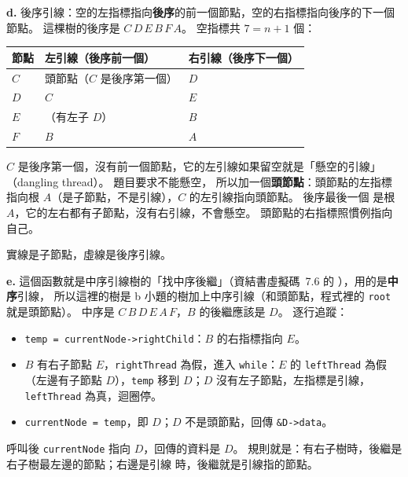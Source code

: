 \begin{pastsoln}
\textbf{d.} 後序引線：空的左指標指向\textbf{後序}的前一個節點，空的右指標指向後序的下一個節點。 這棵樹的後序是
$C\,D\,E\,B\,F\,A$。 空指標共 $7 = n + 1$ 個：
\begin{center}
\begin{tabular}{lll}
\toprule
節點 & 左引線（後序前一個） & 右引線（後序下一個） \\
\midrule
$C$ & 頭節點（$C$ 是後序第一個） & $D$ \\
$D$ & $C$ & $E$ \\
$E$ & （有左子 $D$） & $B$ \\
$F$ & $B$ & $A$ \\
\bottomrule
\end{tabular}
\end{center}
$C$ 是後序第一個，沒有前一個節點，它的左引線如果留空就是「懸空的引線」（dangling thread）。 題目要求不能懸空，
所以加一個\textbf{頭節點}：頭節點的左指標指向根 $A$（是子節點，不是引線），$C$ 的左引線指向頭節點。 後序最後一個
是根 $A$，它的左右都有子節點，沒有右引線，不會懸空。 頭節點的右指標照慣例指向自己。

\begin{center}

實線是子節點，虛線是後序引線。
\end{center}

\textbf{e.} 這個函數就是中序引線樹的「找中序後繼」（資結書虛擬碼~7.6 的 ），用的是\textbf{中序}引線，
所以這裡的樹是 b 小題的樹加上中序引線（和頭節點，程式裡的 \texttt{root} 就是頭節點）。 中序是
$C\,B\,D\,E\,A\,F$，$B$ 的後繼應該是 $D$。 逐行追蹤：
\begin{itemize}
\item \texttt{temp = currentNode->rightChild}：$B$ 的右指標指向 $E$。
\item $B$ 有右子節點 $E$，\texttt{rightThread} 為假，進入 \texttt{while}：$E$ 的 \texttt{leftThread} 為假（左邊有子節點
$D$），\texttt{temp} 移到 $D$；$D$ 沒有左子節點，左指標是引線，\texttt{leftThread} 為真，迴圈停。
\item \texttt{currentNode = temp}，即 $D$；$D$ 不是頭節點，回傳 \texttt{\&D->data}。
\end{itemize}
呼叫後 \texttt{currentNode} 指向 $D$，回傳的資料是 $D$。 規則就是：有右子樹時，後繼是右子樹最左邊的節點；右邊是引線
時，後繼就是引線指的節點。
\end{pastsoln}

